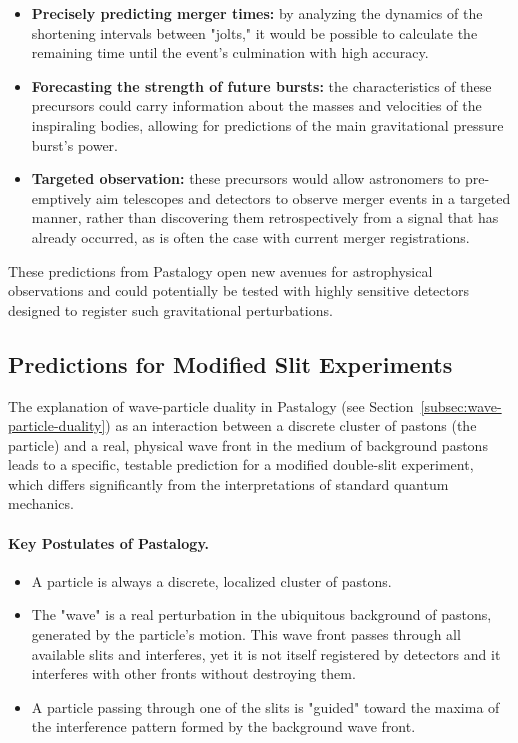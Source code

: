 \documentclass[pdflatex,sn-mathphys-num]{sn-jnl}
\begin{document}
\begin{enumerate}
    \begin{itemize}
        \item \textbf{Precisely predicting merger times:} by analyzing the dynamics of the shortening intervals between "jolts," it would be possible to calculate the remaining time until the event's culmination with high accuracy.
        \item \textbf{Forecasting the strength of future bursts:} the characteristics of these precursors could carry information about the masses and velocities of the inspiraling bodies, allowing for predictions of the main gravitational pressure burst's power.
        \item \textbf{Targeted observation:} these precursors would allow astronomers to pre-emptively aim telescopes and detectors to observe merger events in a targeted manner, rather than discovering them retrospectively from a signal that has already occurred, as is often the case with current merger registrations.
    \end{itemize}
\end{enumerate}

These predictions from Pastalogy open new avenues for astrophysical observations and could potentially be tested with highly sensitive detectors designed to register such gravitational perturbations.

\subsection{Predictions for Modified Slit Experiments}\label{subsec:slit-experiments}

The explanation of wave-particle duality in Pastalogy (see Section~\ref{subsec:wave-particle-duality}) as an interaction between a discrete cluster of pastons (the particle) and a real, physical wave front in the medium of background pastons leads to a specific, testable prediction for a modified double-slit experiment, which differs significantly from the interpretations of standard quantum mechanics.

\paragraph{Key Postulates of Pastalogy.}
\begin{itemize}
    \item A particle is always a discrete, localized cluster of pastons.
    \item The "wave" is a real perturbation in the ubiquitous background of pastons, generated by the particle's motion. This wave front passes through all available slits and interferes, yet it is not itself registered by detectors and it interferes with other fronts without destroying them.
    \item A particle passing through one of the slits is "guided" toward the maxima of the interference pattern formed by the background wave front.
\end{itemize}
\end{document}
